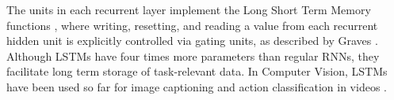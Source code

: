 \documentclass[10pt,twocolumn,letterpaper]{article}
\begin{document}
The units in each recurrent layer  implement the Long Short Term Memory functions \cite{Hochreiter:1997:LSM:1246443.1246450}, where writing, resetting, and reading a value from each recurrent hidden unit is explicitly controlled via gating units, as described by Graves \cite{DBLP:journals/corr/Graves13}. Although LSTMs have four times more parameters than regular RNNs, they  facilitate long term storage of task-relevant data. %
In Computer Vision, LSTMs have been used  so far for image captioning  \cite{DBLP:journals/corr/VinyalsTBE14} and action classification in videos \cite{DBLP:journals/corr/DonahueHGRVSD14}.   
\end{document}
